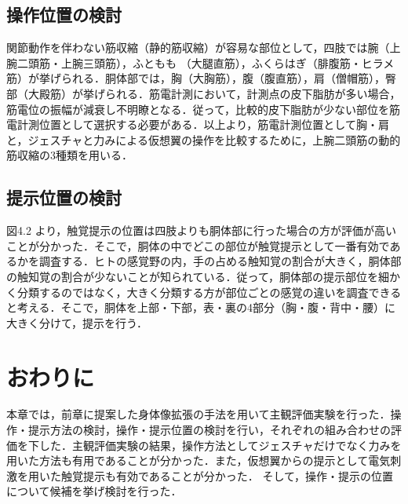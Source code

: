     \subsection{操作位置の検討}
        
        関節動作を伴わない筋収縮（静的筋収縮）が容易な部位として，四肢では腕（上腕二頭筋・上腕三頭筋），ふともも
        （大腿直筋），ふくらはぎ（腓腹筋・ヒラメ筋）が挙げられる．胴体部では，胸（大胸筋），腹（腹直筋），肩（僧帽筋），臀部（大殿筋）が挙げられる．筋電計測において，計測点の皮下脂肪が多い場合，筋電位の振幅が減衰し不明瞭となる\cite{白石恵1992筋電位多点計測による体幹背部の神経支配帯の分布}．従って，比較的皮下脂肪が少ない部位を筋電計測位置として選択する必要がある．以上より，筋電計測位置として胸・肩と，ジェスチャと力みによる仮想翼の操作を比較するために，上腕二頭筋の動的筋収縮の3種類を用いる．

    \subsection{提示位置の検討}
        図4.2
        より，触覚提示の位置は四肢よりも胴体部に行った場合の方が評価が高いことが分かった．そこで，胴体の中でどこの部位が触覚提示として一番有効であるかを調査する．ヒトの感覚野の内，手の占める触知覚の割合が大きく\cite{penfield1950cerebral}，胴体部の触知覚の割合が少ない\cite{gibson1962observations}\cite{丸本耕次1997触覚表示の認知特性に関する研究}\cite{杉輝夫2005身体部位による触知覚の差}ことが知られている．従って，胴体部の提示部位を細かく分類するのではなく，大きく分類する方が部位ごとの感覚の違いを調査できると考える．そこで，胴体を上部・下部，表・裏の4部分（胸・腹・背中・腰）に大きく分けて，提示を行う．        

\section{おわりに}
    本章では，前章に提案した身体像拡張の手法を用いて主観評価実験を行った．操作・提示方法の検討，操作・提示位置の検討を行い，それぞれの組み合わせの評価を下した．主観評価実験の結果，操作方法としてジェスチャだけでなく力みを用いた方法も有用であることが分かった．また，仮想翼からの提示として電気刺激を用いた触覚提示も有効であることが分かった．
    そして，操作・提示の位置について候補を挙げ検討を行った．